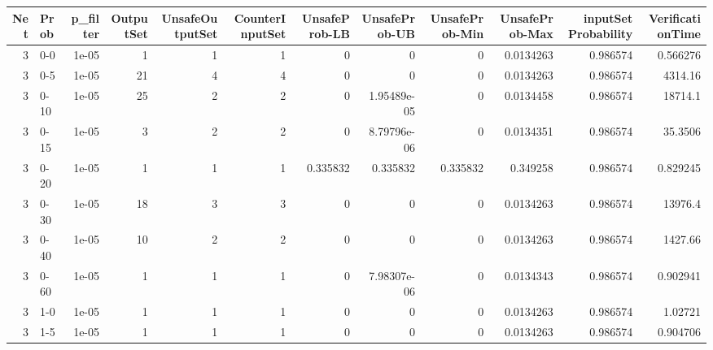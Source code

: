 \begin{tabular}{rlrrrrrrrrrr}
\hline
   Net & Prob   &   p\_filter &   OutputSet &   UnsafeOutputSet &   CounterInputSet &   UnsafeProb-LB &   UnsafeProb-UB &   UnsafeProb-Min &   UnsafeProb-Max &   inputSet Probability &   VerificationTime \\
\hline
     3 & 0-0    &      1e-05 &           1 &                 1 &                 1 &        0        &     0           &         0        &        0.0134263 &               0.986574 &           0.566276 \\
     3 & 0-5    &      1e-05 &          21 &                 4 &                 4 &        0        &     0           &         0        &        0.0134263 &               0.986574 &        4314.16     \\
     3 & 0-10   &      1e-05 &          25 &                 2 &                 2 &        0        &     1.95489e-05 &         0        &        0.0134458 &               0.986574 &       18714.1      \\
     3 & 0-15   &      1e-05 &           3 &                 2 &                 2 &        0        &     8.79796e-06 &         0        &        0.0134351 &               0.986574 &          35.3506   \\
     3 & 0-20   &      1e-05 &           1 &                 1 &                 1 &        0.335832 &     0.335832    &         0.335832 &        0.349258  &               0.986574 &           0.829245 \\
     3 & 0-30   &      1e-05 &          18 &                 3 &                 3 &        0        &     0           &         0        &        0.0134263 &               0.986574 &       13976.4      \\
     3 & 0-40   &      1e-05 &          10 &                 2 &                 2 &        0        &     0           &         0        &        0.0134263 &               0.986574 &        1427.66     \\
     3 & 0-60   &      1e-05 &           1 &                 1 &                 1 &        0        &     7.98307e-06 &         0        &        0.0134343 &               0.986574 &           0.902941 \\
     3 & 1-0    &      1e-05 &           1 &                 1 &                 1 &        0        &     0           &         0        &        0.0134263 &               0.986574 &           1.02721  \\
     3 & 1-5    &      1e-05 &           1 &                 1 &                 1 &        0        &     0           &         0        &        0.0134263 &               0.986574 &           0.904706 \\

\end{tabular}

